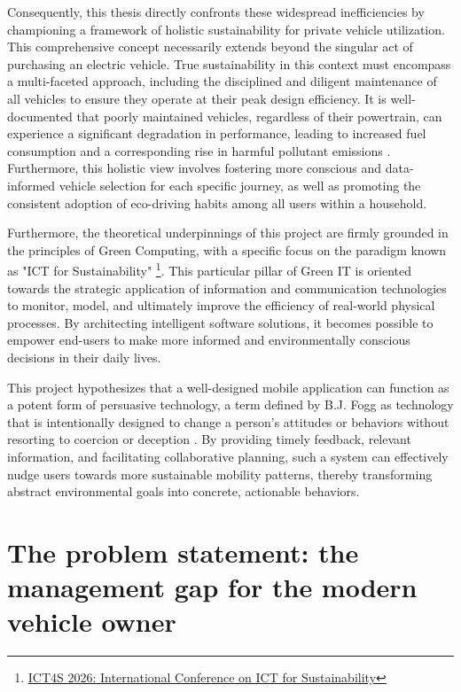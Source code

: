 \textgap

Consequently, this thesis directly confronts these widespread inefficiencies by championing a framework of holistic sustainability for private vehicle utilization. This comprehensive concept necessarily extends beyond the singular act of purchasing an electric vehicle. True sustainability in this context must encompass a multi-faceted approach, including the disciplined and diligent maintenance of all vehicles to ensure they operate at their peak design efficiency. It is well-documented that poorly maintained vehicles, regardless of their powertrain, can experience a significant degradation in performance, leading to increased fuel consumption and a corresponding rise in harmful pollutant emissions \cite{iea2021fuel}. Furthermore, this holistic view involves fostering more conscious and data-informed vehicle selection for each specific journey, as well as promoting the consistent adoption of eco-driving habits among all users within a household.

\textgap

Furthermore, the theoretical underpinnings of this project are firmly grounded in the principles of Green Computing, with a specific focus on the paradigm known as "ICT for Sustainability" \footnote{\href{https://conf.researchr.org/home/ict4s-2026}{ICT4S 2026: International Conference on ICT for Sustainability}}. This particular pillar of Green IT is oriented towards the strategic application of information and communication technologies to monitor, model, and ultimately improve the efficiency of real-world physical processes. By architecting intelligent software solutions, it becomes possible to empower end-users to make more informed and environmentally conscious decisions in their daily lives. 

\textgap

This project hypothesizes that a well-designed mobile application can function as a potent form of persuasive technology, a term defined by B.J. Fogg as technology that is intentionally designed to change a person's attitudes or behaviors without resorting to coercion or deception \cite{fogg2002persuasive}. By providing timely feedback, relevant information, and facilitating collaborative planning, such a system can effectively nudge users towards more sustainable mobility patterns, thereby transforming abstract environmental goals into concrete, actionable behaviors.

\section{The problem statement: the management gap for the modern vehicle owner}

